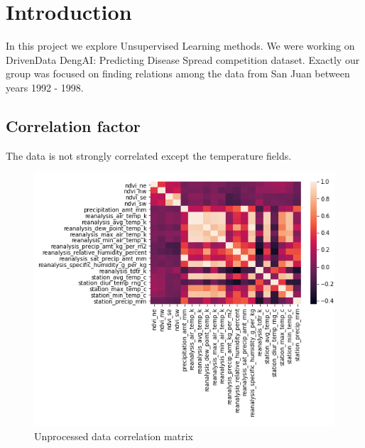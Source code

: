 \documentclass[sigconf]{acmart}
\begin{document}
%
%

\section{Introduction}
In this project we explore Unsupervised Learning methods.
We were working on DrivenData DengAI: Predicting Disease Spread competition dataset.
Exactly our group was focused on finding relations among the data from San Juan between years 1992 - 1998.

\subsection{Correlation factor}
The data is not strongly correlated except the temperature fields.

\begin{figure}[h]
    \includegraphics[width=\linewidth]{correlation.png}
    \centering
    \caption{Unprocessed data correlation matrix}
\end{figure}
\end{document}
